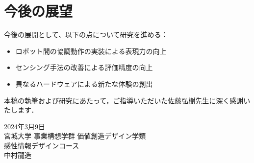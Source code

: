 \documentclass{cuxarticle}
\begin{document}
\section{今後の展望}
今後の展開として、以下の点について研究を進める：

\begin{itemize}
  \item ロボット間の協調動作の実装による表現力の向上
  \item センシング手法の改善による評価精度の向上
  \item 異なるハードウェアによる新たな体験の創出
\end{itemize}

本稿の執筆および研究にあたって，ご指導いただいた佐藤弘樹先生に深く感謝いたします．

\vspace{3\zh}
\begin{flushright}
  2024年3月9日 \\
  宮城大学 事業構想学群 価値創造デザイン学類 \\
  感性情報デザインコース \\
  中村龍造
\end{flushright}

\newpage
\renewcommand{\refname}{\huge 参考文献}


\end{document}
